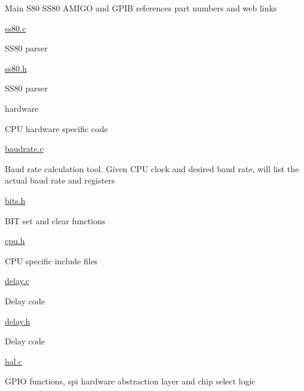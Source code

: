 \begin{DoxyItemize}
\begin{DoxyItemize}
\begin{DoxyItemize}
\item Main S80 S\+S80 A\+M\+I\+GO and G\+P\+IB references part numbers and web links
\end{DoxyItemize}
\item \hyperlink{ss80_8c}{ss80.\+c}
\begin{DoxyItemize}
\item S\+S80 parser
\end{DoxyItemize}
\item \hyperlink{ss80_8h}{ss80.\+h}
\begin{DoxyItemize}
\item S\+S80 parser
\end{DoxyItemize}
\end{DoxyItemize}
\item hardware
\begin{DoxyItemize}
\item C\+PU hardware specific code
\item \hyperlink{baudrate_8c}{baudrate.\+c}
\begin{DoxyItemize}
\item Baud rate calculation tool. Given C\+PU clock and desired baud rate, will list the actual baud rate and registers
\end{DoxyItemize}
\item \hyperlink{bits_8h}{bits.\+h}
\begin{DoxyItemize}
\item B\+IT set and clear functions
\end{DoxyItemize}
\item \hyperlink{cpu_8h}{cpu.\+h}
\begin{DoxyItemize}
\item C\+PU specific include files
\end{DoxyItemize}
\item \hyperlink{delay_8c}{delay.\+c}
\begin{DoxyItemize}
\item Delay code
\end{DoxyItemize}
\item \hyperlink{delay_8h}{delay.\+h}
\begin{DoxyItemize}
\item Delay code
\end{DoxyItemize}
\item \hyperlink{hal_8c}{hal.\+c}
\begin{DoxyItemize}
\item G\+P\+IO functions, spi hardware abstraction layer and chip select logic
\end{DoxyItemize}

\end{DoxyItemize}
\end{DoxyItemize}
